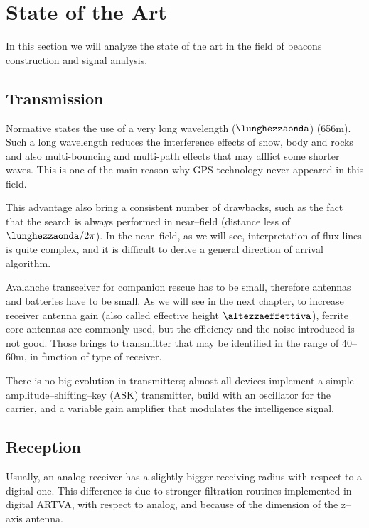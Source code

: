\section{State of the Art}

In this section we will analyze the state of the art in the field of beacons construction and signal analysis.

\subsection{Transmission}

Normative states the use of a very long wavelength ($\lunghezzaonda$) (\num{656}\si{\meter}). Such a long wavelength reduces the interference effects of snow, body and rocks and also multi-bouncing and multi-path effects\citep{balanis2012antenna} that may afflict some shorter waves. This is one of the main reason why GPS technology never appeared in this field\citep{457andfuture}.

This advantage also bring a consistent number of drawbacks, such as the fact that the search is always performed in near--field (distance less of $\lunghezzaonda/2\pi$). In the near--field, as we will see, interpretation of flux lines is quite complex, and it is difficult to derive a general direction of arrival algorithm.

Avalanche transceiver for companion rescue has to be small, therefore antennas and batteries have to be small. As we will see in the next chapter, to increase receiver antenna gain (also called effective height $\altezzaeffettiva$), ferrite core antennas are commonly used, but the efficiency and the noise introduced is not good. Those brings to transmitter that may be identified in the range of \numrange{40}{60}\si{\meter}, in function of type of receiver.

There is no big evolution in transmitters; almost all devices implement a simple amplitude--shifting--key (ASK) transmitter, build with an oscillator for the carrier, and a variable gain amplifier that modulates the intelligence signal.

\subsection{Reception}

Usually, an analog receiver has a slightly bigger receiving radius with respect to a digital one. This difference is due to stronger filtration routines implemented in digital ARTVA, with respect to analog, and because of the dimension of the z--axis antenna.

